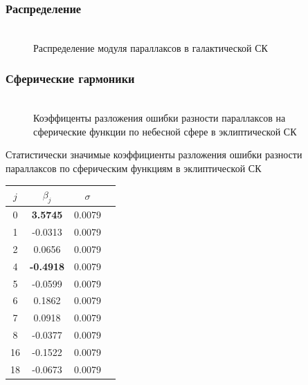 \documentclass[12pt,aspectratio=43]{beamer}
\begin{document}
\begin{frame}[<alignment>]
\frametitle{Распределение}
\begin{figure}[h!]
\\{Распределение модуля параллаксов в галактической СК}
\label{img:sf_l}
\end{figure}

\end{frame}	
\begin{frame}
\frametitle{Сферические гармоники}
\begin{figure}[h!]
\\{Коэффиценты разложения ошибки разности параллаксов на сферические функции по небесной сфере в эклиптической СК}
\end{figure}

\end{frame}	
\begin{frame}
Статистически значимые коэффициенты разложения ошибки разности параллаксов по сферическим функциям в эклиптической СК
\begin{table}[h]
\centering
\begin{tabular}{|c|c|c|c|}
\hline 	
$j$ &$\beta_{j}$ & $\sigma$\\
\hline
\hline
0&	\textbf{3.5745} &0.0079\\
1&	-0.0313 & 0.0079\\
2&	0.0656 & 0.0079\\
4	&\textbf{-0.4918}  &0.0079\\
5&	-0.0599  &0.0079\\
6&	0.1862  &0.0079\\
7&	0.0918  &0.0079\\
8&	-0.0377  &0.0079\\
16&	-0.1522  &0.0079\\
18&	-0.0673  &0.0079\\
\hline 	
\end{tabular}
\end{table}
\end{frame}
\end{document}
